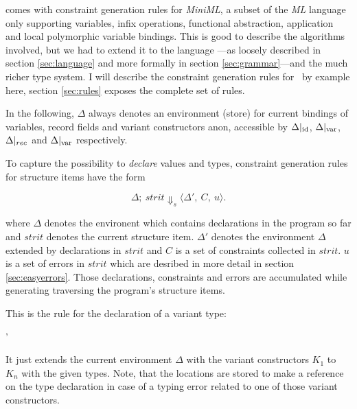 \citet{haackwells04} comes with constraint generation rules for
\textsl{MiniML}, a subset of the \textsl{ML} language only supporting
variables, infix operations, functional abstraction, application and local
polymorphic variable bindings.
This is good to describe the algorithms involved, but we had to extend it to the
language \camlm---as loosely described in section \ref{sec:language} and more
formally in section \ref{sec:grammar}---and the much richer type system.
I will describe the constraint generation rules for \easyocaml\ by example
here, section \ref{sec:rules} exposes the complete set of rules.

In the following, $\Delta$ always denotes an environment (store) for current
bindings of variables, record fields and variant constructors anon, accessible
by $\Delta|_{\text{id}}$, $\Delta|_{\text{var}}$, $\Delta|_{rec}$ and $\Delta|_{\text{var}}$
respectively.

To capture the possibility to \emph{declare} values and types, constraint
generation rules for structure items have the form

\[ \Delta;\ strit \Downarrow_s \langle \Delta',\ C,\ u\rangle.\]

\noindent where $\Delta$ denotes the environent which contains declarations in
the program so far and $strit$ denotes the current structure item.
$\Delta'$ denotes the environment $\Delta$ extended by declarations in $strit$
and $C$ is a set of constraints collected in $strit$.
$u$ is a set of errors in $strit$ which are desribed in more detail in section
\ref{sec:easyerrors}.
Those declarations, constraints and errors are accumulated while generating
traversing the program's structure items.

This is the rule for the declaration of a variant type:

\vspace{1em}\centerline{
{\styjudge {} {\Delta'} \emptyset \emptyset}}
\vspace{1em}

\noindent It just extends the current environment $\Delta$ with the variant constructors
$K_1$ to $K_n$ with the given types.
Note, that the locations are stored to make a reference on the type declaration
in case of a typing error related to one of those variant constructors.

